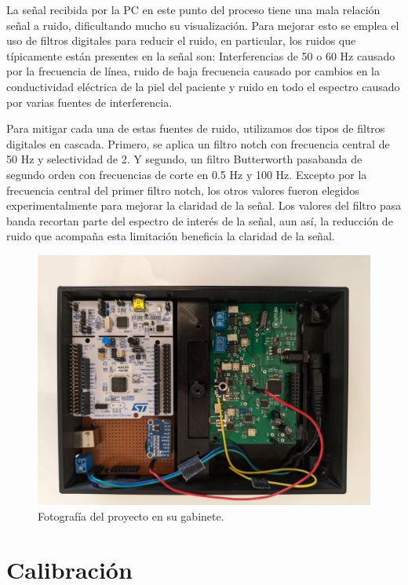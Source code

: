 \documentclass[conference]{IEEEtran}
\begin{document}
La señal recibida por la PC en este punto del proceso tiene una mala relación señal a
ruido, dificultando mucho su visualización. Para mejorar esto se emplea el uso de
filtros digitales para reducir el ruido, en particular, los ruidos que típicamente
están presentes en la señal son: Interferencias de 50 o 60 Hz causado por la
frecuencia de línea, ruido de baja frecuencia causado por cambios en la conductividad
eléctrica de la piel del paciente y ruido en todo el espectro causado por varias
fuentes de interferencia.

Para mitigar cada una de estas fuentes de ruido, utilizamos dos tipos de filtros
digitales en cascada. Primero, se aplica un filtro notch con frecuencia central de
50 Hz y selectividad de 2. Y segundo, un filtro Butterworth pasabanda de segundo
orden con frecuencias de corte en 0.5 Hz y 100 Hz. Excepto por la frecuencia central
del primer filtro notch, los otros valores fueron elegidos experimentalmente para
mejorar la claridad de la señal. Los valores del filtro pasa banda recortan parte
del espectro de interés de la señal, aun así, la reducción de ruido que acompaña
esta limitación beneficia la claridad de la señal.


\begin{figure}[thb]
    \centerline{\includegraphics[width=\linewidth]{figs/foto_proyecto.jpeg}}
    \caption{Fotografía del proyecto en su gabinete.}
    \label{fig:foto_proyecto}
    \end{figure}

\section{Calibración}
\end{document}
